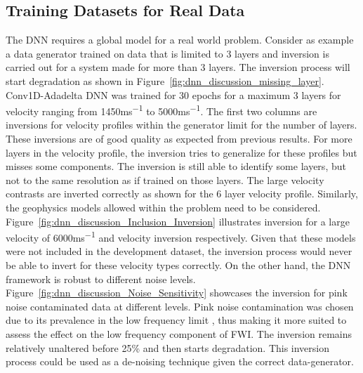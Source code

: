 \subsection{Training Datasets for Real Data}\label{ref:sec_disc_development_dataset}
The DNN requires a global model for a real world problem. Consider as example a data generator trained on data that is limited to 3 layers and inversion is carried out for a system made for more than 3 layers. The inversion process will start degradation as shown in Figure~\ref{fig:dnn_discussion_missing_layer}. Conv1D-Adadelta DNN was trained for 30 epochs for a maximum 3 layers for velocity ranging from 1450\si{ms^{-1}} to 5000\si{ms^{-1}}. The first two columns are inversions for velocity profiles within the generator limit for the number of layers. These inversions are of good quality as expected from previous results. For more layers in the velocity profile, the inversion tries to generalize for these profiles but misses some components. The inversion is still able to identify some layers, but not to the same resolution as if trained on those layers. The large velocity contrasts are inverted correctly as shown for the 6 layer velocity profile. Similarly, the geophysics models allowed within the problem need to be considered. Figure~\ref{fig:dnn_discussion_Inclusion_Inversion} illustrates inversion for a large velocity of 6000\si{ms^{-1}} and velocity inversion respectively. Given that these models were not included in the development dataset, the inversion process would never be able to invert for these velocity types correctly. On the other hand, the DNN framework is robust to different noise levels. Figure~\ref{fig:dnn_discussion_Noise_Sensitivity} showcases the inversion for pink noise contaminated data at different levels. Pink noise contamination was chosen due to its prevalence in the low frequency limit \citep{Randall2009}, thus making it more suited to assess the effect on the low frequency component of FWI. The inversion remains relatively unaltered before 25\% and then starts degradation. This inversion process could be used as a de-noising technique given the correct data-generator. 

